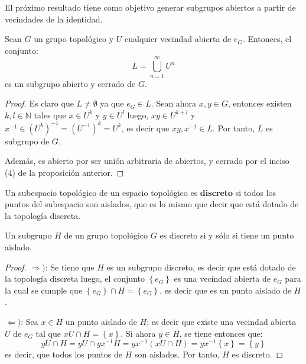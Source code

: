 \documentclass[12pt]{report}
\theoremstyle{largebreak}
\begin{document}
    El próximo resultado tiene como objetivo generar subgrupos abiertos a partir de vecindades de la identidad.

    \begin{theor}
        Sean $G$ un grupo topológico y $U$ cualquier vecindad abierta de $e_G$. Entonces, el conjunto:
        \begin{equation*}
            L=\bigcup_{n=1}^\infty U^n
        \end{equation*}
        es un subgrupo abierto y cerrado de $G$.
    \end{theor}

    \begin{proof}
        Es claro que $L\neq\emptyset$ ya que $e_G\in L$. Sean ahora $x,y\in G$, entonces existen $k,l\in\mathbb{N}$ tales que $x\in U^k$ y $y\in U^l$ luego, $xy\in U^{k+l}$ y $x^{-1}\in \left(U^{k}\right)^{-1}=(U^{-1})^k= U^k$, es decir que $xy,x^{-1}\in L$. Por tanto, $L$ es subgrupo de $G$.

        Además, es abierto por ser unión arbitraria de abiertos, y cerrado por el inciso (4) de la proposición anterior.
    \end{proof}

    \begin{obs}
        Un subespacio topológico de un espacio topológico es \textbf{discreto} si todos los puntos del subespacio son aislados, que es lo mismo que decir que está dotado de la topología discreta.
    \end{obs}

    \begin{propo}
        Un subgrupo $H$ de un grupo topológico $G$ es discreto si y sólo si tiene un punto aislado.
    \end{propo}

    \begin{proof}
        $\Rightarrow)$: Se tiene que $H$ es un subgrupo discreto, es decir que está dotado de la topología discreta luego, el conjunto $\left\{e_G\right\}$ es una vecindad abierta de $e_G$ para la cual se cumple que $\left\{e_G\right\}\cap H=\left\{e_G\right\}$, es decir que es un punto aislado de $H$.

        $\Leftarrow)$: Sea $x\in H$ un punto aislado de $H$; es decir que existe una vecindad abierta $U$ de $e_G$ tal que $xU\cap H=\left\{x\right\}$. Si ahora $y\in H$, se tiene entonces que:
        \begin{equation*}
            yU\cap H=yU\cap yx^{-1}H=yx^{-1}(xU\cap H)=yx^{-1}\left\{x\right\}=\left\{y\right\}
        \end{equation*}
        es decir, que todos los puntos de $H$ son aislados. Por tanto, $H$ es discreto.
    \end{proof}
\end{document}
